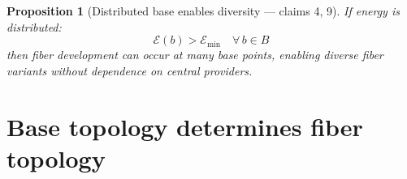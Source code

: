 \documentclass[11pt,a4paper]{article}
\newtheorem{proposition}[definition]{Proposition}
\begin{document}
\begin{proposition}[Distributed base enables diversity --- claims 4, 9]
\label{prop:decentral}
If energy is distributed:
\[
  \mathcal{E}(b) > \mathcal{E}_{\min} \quad \forall\, b \in B
\]
then fiber development can occur at many base points, enabling diverse
fiber variants without dependence on central providers.
\end{proposition}


\section{Base topology determines fiber topology}
\label{sec:topology}
\end{document}

